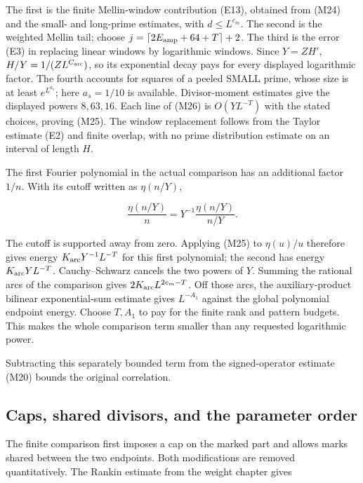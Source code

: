 The first is the finite Mellin-window contribution (E13), obtained from
(M24) and the small- and long-prime estimates, with \(d\le L^{c_m}\).
The second is the weighted Mellin tail; choose
\(j=\lceil2E_{\rm amp}+64+T\rceil+2\). The third is the error (E3) in
replacing linear windows by logarithmic windows. Since \(Y=ZH'\),
\(H/Y=1/(ZL^{C_{\rm arc}})\), so its exponential decay pays for every
displayed logarithmic factor. The fourth accounts for squares of a
peeled SMALL prime, whose size is at least \(e^{L^{a_s}}\); here
\(a_s=1/10\) is available. Divisor-moment estimates give the displayed
powers \(8,63,16\). Each line of (M26) is \(O(YL^{-T})\) with the stated
choices, proving (M25). The window replacement follows from the Taylor
estimate (E2) and finite overlap, with no prime distribution estimate on
an interval of length \(H\).

The first Fourier polynomial in the actual comparison has an additional
factor \(1/n\). With its cutoff written as \(\eta(n/Y)\),

\[
\frac{\eta(n/Y)}n=Y^{-1}\frac{\eta(n/Y)}{n/Y}.
\]

The cutoff is supported away from zero. Applying (M25) to \(\eta(u)/u\)
therefore gives energy \(K_{\rm arc}Y^{-1}L^{-T}\) for this first
polynomial; the second has energy \(K_{\rm arc}YL^{-T}\).
Cauchy--Schwarz cancels the two powers of \(Y\). Summing the rational
arcs of the comparison gives \(2K_{\rm arc}L^{2c_m-T}\). Off those arcs,
the auxiliary-product bilinear exponential-sum estimate gives
\(L^{-A_1}\) against the global polynomial endpoint energy. Choose
\(T,A_1\) to pay for the finite rank and pattern budgets. This makes the
whole comparison term smaller than any requested logarithmic power.

Subtracting this separately bounded term from the signed-operator
estimate (M20) bounds the original correlation.


\hypertarget{marked-correlation-caps-shared-divisors-and-the-parameter-order}{%
\subsection{Caps, shared divisors, and the parameter
order}\label{marked-correlation-caps-shared-divisors-and-the-parameter-order}}

The finite comparison first imposes a cap on the marked part and allows
marks shared between the two endpoints. Both modifications are removed
quantitatively. The Rankin estimate from the weight chapter gives

